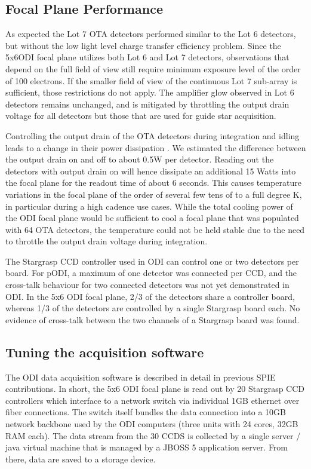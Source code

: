\documentclass[]{spieman}
\begin{document}
\subsection{Focal Plane  Performance}

As expected the Lot 7 OTA detectors performed similar to the Lot 6 detectors, but without the 
low light level charge transfer efficiency problem. Since the 5x6ODI focal plane  utilizes  both 
Lot 6 and Lot 7 detectors, observations that depend on the full field of view still
require minimum exposure level of the order of 100 electrons. If the smaller field of view of
the continuous Lot 7 sub-array is sufficient, those restrictions do not apply. The amplifier glow
observed in Lot 6 detectors remains unchanged, and is mitigated by throttling  the output drain 
voltage for all detectors but those that are used for guide star acquisition.

Controlling the output drain of the OTA detectors during integration and idling leads to a change 
in their power dissipation . We estimated the  difference between the
output drain on and off to about 0.5W per detector. Reading out the detectors with output drain on
will hence dissipate an additional 15 Watts into the focal plane for the readout time of about 6 seconds. 
This causes temperature variations in the focal plane of the order of several  few tens of to a full degree K, in
particular during a high cadence use cases. While the total cooling power of the
ODI focal plane would be sufficient to cool a focal plane that was populated with 64 OTA detectors, 
the temperature could not be held stable due to the need to throttle the output drain voltage during integration.


The Stargrasp CCD controller\cite{Onaka2008} used in ODI can control one or two detectors per board. For
pODI, a maximum of one detector was connected per CCD, and the cross-talk behaviour for two connected detectors was 
not yet demonstrated in ODI. In the 5x6 ODI focal plane, 2/3 of the detectors share a controller board, whereas 1/3
of the detectors are controlled by a single Stargrasp board each. No evidence of cross-talk between the two channels 
of a Stargrasp board was found. 



\subsection{Tuning the acquisition software}

The ODI data acquisition software is described in detail in previous SPIE
 contributions\cite{Yeatts2008,Yeatts2010}.
In short, the 5x6 ODI focal plane is read out by 20 Stargrasp CCD controllers which
interface to a network switch via individual  1GB ethernet over fiber
connections. The switch itself bundles the data connection into a 10GB network
backbone used by the ODI computers (three units with 24 cores, 32GB RAM each). The 
data stream from the 30 CCDS is collected by a single server / java virtual machine that is
managed by a JBOSS 5 application server. From there, data are saved to a storage device. 
\end{document}
